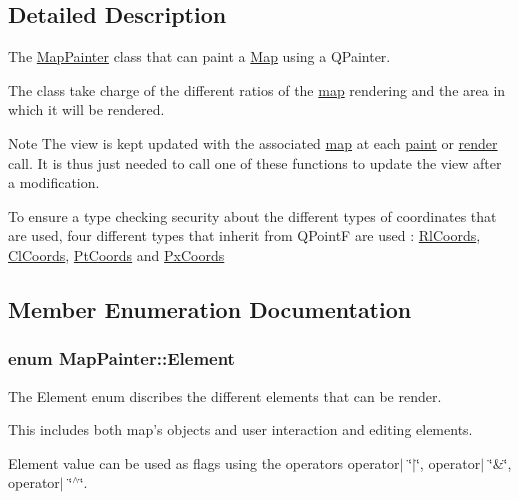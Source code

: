 \subsection{\-Detailed \-Description}
\-The \hyperlink{class_map_painter}{\-Map\-Painter} class that can paint a \hyperlink{class_map}{\-Map} using a \-Q\-Painter. 

\-The class take charge of the different ratios of the \hyperlink{class_map}{map} rendering and the area in which it will be rendered.

\begin{DoxyNote}{\-Note}
\-The view is kept updated with the associated \hyperlink{class_map}{map} at each \hyperlink{class_map_painter_a0deb552b94eff8f8751946928d7cd5b8}{paint} or \hyperlink{class_map_painter_a1c20cf03d0376290481bd80b9f8ef013}{render} call. \-It is thus just needed to call one of these functions to update the view after a modification.
\end{DoxyNote}
\-To ensure a type checking security about the different types of coordinates that are used, four different types that inherit from \-Q\-Point\-F are used \-: \hyperlink{class_rl_coords}{\-Rl\-Coords}, \hyperlink{class_cl_coords}{\-Cl\-Coords}, \hyperlink{class_pt_coords}{\-Pt\-Coords} and \hyperlink{class_px_coords}{\-Px\-Coords} 

\subsection{\-Member \-Enumeration \-Documentation}
\hypertarget{class_map_painter_a771b3fa246b6c13cc2acbdcf1cb6eee3}{
\subsubsection[{\-Element}]{\setlength{\rightskip}{0pt plus 5cm}enum {\bf \-Map\-Painter\-::\-Element}}}\label{class_map_painter_a771b3fa246b6c13cc2acbdcf1cb6eee3}


\-The \-Element enum discribes the different elements that can be render. 

\-This includes both map's objects and user interaction and editing elements.

\-Element value can be used as flags using the operators operator$|$ \char`\"{}$|$\char`\"{}, operator$|$ \char`\"{}\&\char`\"{}, operator$|$ \char`\"{}$^\wedge$\char`\"{}.

